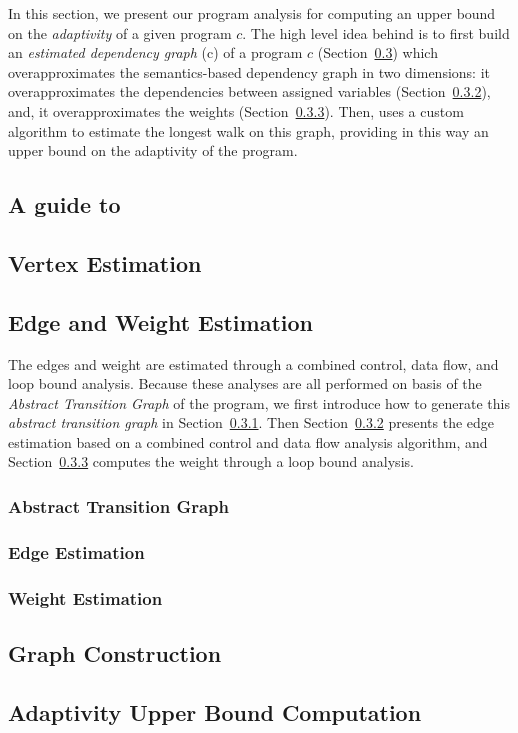 In this section, we present our program analysis {\THESYSTEM} for
computing an upper bound on the \emph{adaptivity} of a given program
$c$.  The high level idea behind {\THESYSTEM} is to first build
an \emph{estimated dependency graph} \progG(c) of a program $c$
(Section~\ref{sec:alg_weightedgegen}) which overapproximates the
semantics-based dependency graph in two dimensions: it
overapproximates the dependencies between assigned variables (Section~\ref{sec:alg_edgegen}), and, it
overapproximates the weights (Section~\ref{sec:alg_weightgen}). Then, {\THESYSTEM} uses a custom algorithm to estimate the longest
walk on this graph, providing in this way an upper bound on the adaptivity of the
program.
%
\subsection{A guide to {\THESYSTEM}}
\label{sec:alg_guide}


\subsection{Vertex Estimation}
\label{sec:alg_vertexgen}



\subsection{Edge and Weight Estimation}
\label{sec:alg_weightedgegen}
The edges and weight are estimated through a combined control, data flow, and loop bound analysis.
Because these analyses are all performed on basis of the \emph{Abstract Transition Graph} of the program, we first introduce how to generate this \emph{abstract transition graph} in Section~\ref{sec:alg_abscfg}.
Then Section~\ref{sec:alg_edgegen} presents the edge estimation based on a combined control and data flow analysis algorithm,
and Section~\ref{sec:alg_weightgen}
computes the weight through a loop bound analysis.

\subsubsection{Abstract Transition Graph}
\label{sec:alg_abscfg}

%
\subsubsection{Edge Estimation}
\label{sec:alg_edgegen}
% 



\subsubsection{Weight Estimation}
\label{sec:alg_weightgen}

%
%
\subsection{Graph Construction}
\label{sec:alg_graphgen}


\subsection{Adaptivity Upper Bound Computation}
\label{sec:alg_adaptcompute}
% 
